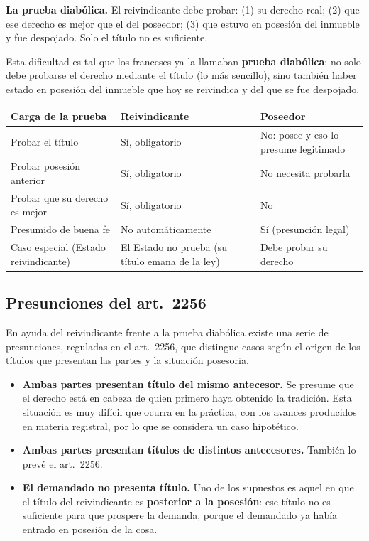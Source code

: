 \documentclass[12pt,oneside]{book}
\begin{document}
\begin{important}
\textbf{La prueba diabólica.} El reivindicante debe probar: (1) su derecho real; (2) que ese derecho es mejor que el del poseedor; (3) que estuvo en posesión del inmueble y fue despojado. Solo el título no es suficiente.
\end{important}

Esta dificultad es tal que los franceses ya la llamaban \textbf{prueba diabólica}: no solo debe probarse el derecho mediante el título (lo más sencillo), sino también haber estado en posesión del inmueble que hoy se reivindica y del que se fue despojado.

\begin{table}[H]
\centering
\small
\begin{tabularx}{\textwidth}{@{}>{\raggedright\arraybackslash}p{}>{\raggedright\arraybackslash}X>{\raggedright\arraybackslash}X@{}}
\toprule
\textbf{Carga de la prueba} & \textbf{Reivindicante} & \textbf{Poseedor} \\
\midrule
Probar el título & Sí, obligatorio & No: posee y eso lo presume legitimado \\
Probar posesión anterior & Sí, obligatorio & No necesita probarla \\
Probar que su derecho es mejor & Sí, obligatorio & No \\
Presumido de buena fe & No automáticamente & Sí (presunción legal) \\
Caso especial (Estado reivindicante) & El Estado no prueba (su título emana de la ley) & Debe probar su derecho \\
\bottomrule
\end{tabularx}
\end{table}

\subsection{Presunciones del art.~2256}

En ayuda del reivindicante frente a la prueba diabólica existe una serie de presunciones, reguladas en el art.~2256, que distingue casos según el origen de los títulos que presentan las partes y la situación posesoria.

\begin{itemize}
    \item \textbf{Ambas partes presentan título del mismo antecesor.} Se presume que el derecho está en cabeza de quien primero haya obtenido la tradición. Esta situación es muy difícil que ocurra en la práctica, con los avances producidos en materia registral, por lo que se considera un caso hipotético.
    \item \textbf{Ambas partes presentan títulos de distintos antecesores.} También lo prevé el art.~2256.
    \item \textbf{El demandado no presenta título.} Uno de los supuestos es aquel en que el título del reivindicante es \textbf{posterior a la posesión}: ese título no es suficiente para que prospere la demanda, porque el demandado ya había entrado en posesión de la cosa.
\end{itemize}
\end{document}
